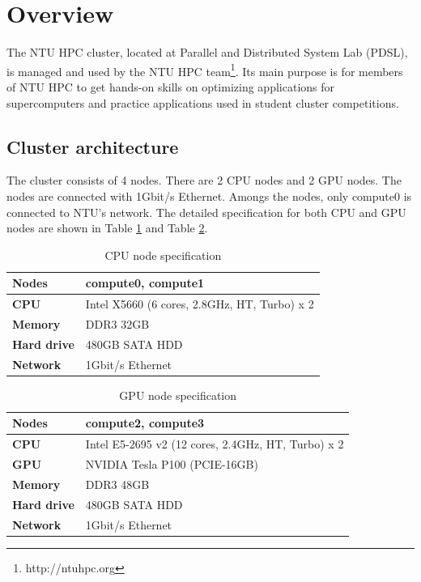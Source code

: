 \section{Overview}

The NTU HPC cluster, located at Parallel and Distributed System Lab (PDSL), is managed and used by the NTU HPC team\footnote{http://ntuhpc.org}. Its main purpose is for members of NTU HPC to get hands-on skills on optimizing applications for supercomputers and practice applications used in student cluster competitions.

\subsection{Cluster architecture}

The cluster consists of 4 nodes. There are 2 CPU nodes and 2 GPU nodes. The nodes are connected with 1Gbit/s Ethernet. Amongs the nodes, only compute0 is connected to NTU's network. The detailed specification for both CPU and GPU nodes are shown in Table \ref{table:cpu} and Table \ref{table:gpu}.

\begin{table}[ht]
\centering
\caption{CPU node specification}
\label{table:cpu}
\begin{tabular}{|l|l|}
\hline
\textbf{Nodes}      & compute0, compute1                       \\ \hline
\textbf{CPU}        & Intel X5660 (6 cores, 2.8GHz, HT, Turbo) x 2 \\ \hline
\textbf{Memory}     & DDR3 32GB                                \\ \hline
\textbf{Hard drive} & 480GB SATA HDD                           \\ \hline
\textbf{Network}    & 1Gbit/s Ethernet                         \\ \hline
\end{tabular}
\end{table}

\begin{table}[ht]
\centering
\caption{GPU node specification}
\label{table:gpu}
\begin{tabular}{|l|l|}
\hline
\textbf{Nodes}      & compute2, compute3                             \\ \hline
\textbf{CPU}        & Intel E5-2695 v2 (12 cores, 2.4GHz, HT, Turbo) x 2 \\ \hline
\textbf{GPU}        & NVIDIA Tesla P100 (PCIE-16GB)                  \\ \hline
\textbf{Memory}     & DDR3 48GB                                      \\ \hline
\textbf{Hard drive} & 480GB SATA HDD                                 \\ \hline
\textbf{Network}    & 1Gbit/s Ethernet                               \\ \hline
\end{tabular}
\end{table}

